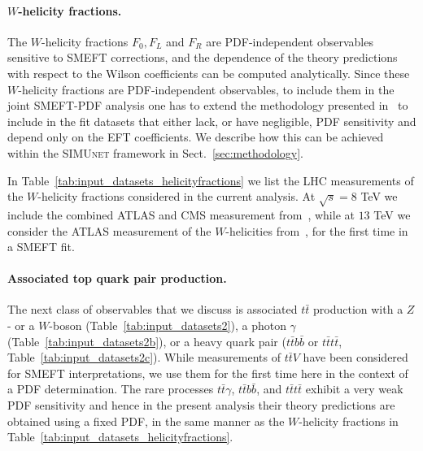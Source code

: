 \documentclass[withindex,glossary]{cam-thesis}
\newcommand{\simunet}{\textsc{SIMUnet}}
\begin{document}


\paragraph{$W$-helicity fractions.}
%
The $W$-helicity fractions $F_0, F_L$ and $F_R$ are PDF-independent observables
sensitive to SMEFT corrections, and the dependence of the theory predictions
with respect to the Wilson coefficients can be computed
analytically.
%
Since these $W$-helicity fractions are PDF-independent observables, to include them
in the joint SMEFT-PDF analysis one has to extend the methodology presented in~\cite{Iranipour:2022iak}
to include in the fit datasets that either lack, or have negligible, PDF sensitivity
and depend only on the EFT coefficients.
%
We describe how this can be achieved within the \simunet{} framework
in Sect.~\ref{sec:methodology}. 

In Table~\ref{tab:input_datasets_helicityfractions} we list
the LHC measurements of the $W$-helicity fractions considered in the current analysis.
%
At $\sqrt{s}=8$ TeV we include the combined ATLAS and CMS measurement from~\cite{Aad:2020jvx},
while at $13$ TeV we consider the ATLAS measurement of the $W$-helicities from~\cite{ATLAS:2022bdg},
for the first time in a SMEFT fit.



\paragraph{Associated top quark pair production.}
%
The next class of observables that we discuss is associated $t\bar{t}$ production with a $Z$- or a $W$-boson (Table~\ref{tab:input_datasets2}), a photon $\gamma$ (Table~\ref{tab:input_datasets2b}), or a heavy quark pair ($t\bar{t}b\bar{b}$ or $t\bar{t}t\bar{t}$, Table~\ref{tab:input_datasets2c}).
%
While measurements of $t\bar{t}V$ have been considered for SMEFT interpretations,
we use them for the first time here in the context of a PDF determination.
%
The rare processes $t\bar{t}\gamma$, $t\bar{t}b\bar{b}$, and $t\bar{t}t\bar{t}$ exhibit
a very weak PDF sensitivity and hence in the present analysis their theory predictions
are obtained using a fixed PDF, in the same manner as the $W$-helicity fractions
in Table~\ref{tab:input_datasets_helicityfractions}.
\end{document}
